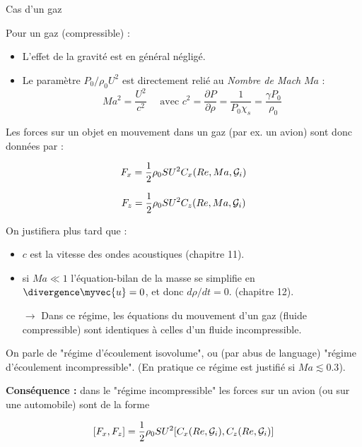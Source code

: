 \begin{frame}{Cas d'un gaz}

\small
Pour un gaz (compressible) :
\smallskip
\pause 
\begin{itemize}


\item L'effet de la gravité est en général négligé.

\pause

\item 
Le paramètre $P_0/\rho_0 U^2$ est directement relié au {\em Nombre de Mach} $Ma$ : 
$$
Ma^2 = \frac{U^2}{c^2} \quad \mbox{ avec } c^2 = \frac{\partial P}{\partial \rho} = \frac{1}{P_0 \chi_s} = \frac{\gamma P_0}{\rho_0}
$$


\end{itemize}

\smallskip
\pause 
Les forces sur un objet en mouvement dans un gaz (par ex. un avion) sont donc données par :

$$
F_x = \frac{1}{2} \rho_0 S U^2 C_x(Re,Ma, {\cal G}_i) 
$$

$$
F_z = \frac{1}{2} \rho_0 S U^2 C_z(Re,Ma, {\cal G}_i) 
$$

\pause
\medskip

On justifiera plus tard que :
\smallskip

\begin{itemize}
\item $c$ est la vitesse des ondes acoustiques (chapitre 11).

\item si $Ma \ll1$ l'équation-bilan de la masse se simplifie en 
 $\divergence  \myvec{u} = 0$, et donc $d\rho / dt =0$. (chapitre 12).
   
 $\rightarrow$ Dans ce régime, les équations du mouvement d'un gaz (fluide compressible) sont identiques à celles d'un fluide incompressible.
 
 \end{itemize}
 
 
 On parle de "régime d'écoulement isovolume", ou (par abus de language) "régime d'écoulement incompressible". (En pratique ce régime est justifié si $Ma\lesssim 0.3$).
 
 \pause 
 \medskip
 
{\bf Conséquence :} dans le "régime incompressible" les forces sur un avion (ou sur une automobile) sont de la forme 

$$
[F_x,F_z] = \frac{1}{2} \rho_0 S U^2 [C_x(Re,{\cal G}_i) ,C_z(Re,{\cal G}_i) ] 
$$


\end{frame}




